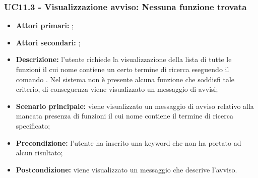 \subsubsection{UC11.3 - Visualizzazione avviso: Nessuna funzione trovata}
\begin{itemize}
	\item \textbf{Attori primari:} \ua{};
	\item \textbf{Attori secondari:} \re{};
	\item \textbf{Descrizione:} l’utente richiede la visualizzazione della lista di tutte le funzioni il cui nome contiene un certo termine di ricerca eseguendo il comando \psearch{}. Nel sistema non è presente alcuna funzione che soddisfi tale criterio, di conseguenza viene visualizzato un messaggio di avvisi; 
	\item \textbf{Scenario principale:} viene visualizzato un messaggio di avviso relativo alla mancata presenza di funzioni il cui nome contiene il termine di ricerca specificato;
	\item \textbf{Precondizione:} l’utente ha inserito una keyword che non ha portato ad alcun risultato;
	\item \textbf{Postcondizione:} viene visualizzato un messaggio che descrive l'avviso.
\end{itemize}